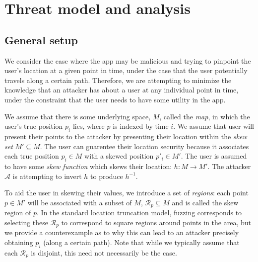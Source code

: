 \documentclass{article}
\begin{document}
\section{Threat model and analysis}

\subsection{General setup}

We consider the case where the app may be malicious and trying to
pinpoint the user's location at a given point in time, under the case
that the user potentially travels along a certain path.  Therefore, we
are attempting to minimize the knowledge that an attacker has about a
user at any individual point in time, under the constraint that the
user needs to have some utility in the app.


We assume that there is some underlying space, $M$, called the
\emph{map}, in which the user's true position $p_i$ lies, where $p$ is
indexed by time $i$.  We assume that user will present their points to
the attacker by presenting their location within the \emph{skew set}
$M' \subseteq M$.  The user can guarentee their location security
because it associates each true position $p_i \in M$ with a skewed
position $p'_i \in M'$.  The user is assumed to have some \emph{skew
  function} which skews their location: $h : M \rightarrow M'$.  The
attacker $\mathcal{A}$ is attempting to invert $h$ to produce
$h^{-1}$.

To aid the user in skewing their values, we introduce a set of
\emph{regions}: each point $p \in M'$ will be associated with a subset
of $M$, $\mathcal{R}_p \subseteq M$ and is called the skew region of
$p$.  In the standard location truncation model, fuzzing corresponds
to selecting these $\mathcal{R}_p$ to correspond to square regions
around points in the area, but we provide a counterexample as to why
this can lead to an attacker precisely obtaining $p_i$ (along a
certain path).  Note that while we typically assume that each
$\mathcal{R}_p$ is disjoint, this need not necessarily be the case.
\\
\end{document}
